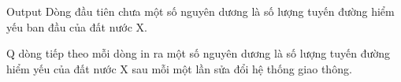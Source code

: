 Output
Dòng đầu tiên chưa một số nguyên dương là số lượng tuyến đường hiểm yếu ban đầu của đất nước X.  

   Q dòng tiếp theo mỗi dòng in ra một số nguyên dương là số lượng tuyến đường hiểm yếu của đất nước X sau mỗi một lần sửa đổi hệ thống giao thông.